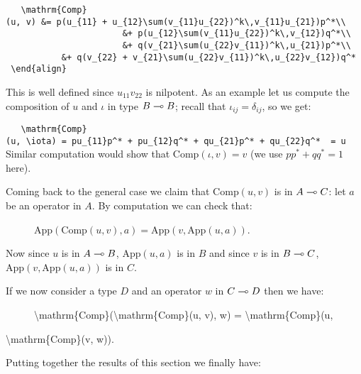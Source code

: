 \texttt{~~~\textbackslash{}mathrm\{Comp\}(u,~v)~\&=~p(u\_\{11\}~+~u\_\{12\}\textbackslash{}sum(v\_\{11\}u\_\{22\})\^{}k\textbackslash{},v\_\{11\}u\_\{21\})p\^{}*\textbackslash{}\textbackslash{}}\\
\texttt{~~~~~~~~~~~~~~~~~~~~~~~\&+~p(u\_\{12\}\textbackslash{}sum(v\_\{11\}u\_\{22\})\^{}k\textbackslash{},v\_\{12\})q\^{}*\textbackslash{}\textbackslash{}}\\
\texttt{~~~~~~~~~~~~~~~~~~~~~~~\&+~q(v\_\{21\}\textbackslash{}sum(u\_\{22\}v\_\{11\})\^{}k\textbackslash{},u\_\{21\})p\^{}*\textbackslash{}\textbackslash{}}\\
\texttt{~~~~~~~~~~~\&+~q(v\_\{22\}~+~v\_\{21\}\textbackslash{}sum(u\_\{22\}v\_\{11\})\^{}k\textbackslash{},u\_\{22\}v\_\{12\})q\^{}*}\\
\texttt{~\textbackslash{}end\{align\}}

This is well defined since \(u_{11}v_{22}\) is nilpotent. As an example
let us compute the composition of \(u\) and \(\iota\) in type
\(B\multimap B\); recall that \(\iota_{ij} = \delta_{ij}\), so we get:

\begin{description}
\item[]
\end{description}

\texttt{~~~\textbackslash{}mathrm\{Comp\}(u,~\textbackslash{}iota)~=~pu\_\{11\}p\^{}*~+~pu\_\{12\}q\^{}*~+~qu\_\{21\}p\^{}*~+~qu\_\{22\}q\^{}*~~=~u}\\

Similar computation would show that \(\mathrm{Comp}(\iota, v) = v\) (we
use \(pp^* + qq^* = 1\) here).

Coming back to the general case we claim that \(\mathrm{Comp}(u, v)\) is
in \(A\multimap C\): let \(a\) be an operator in \(A\). By computation we
can check that:

\begin{description}
\item[]
\(\mathrm{App}(\mathrm{Comp}(u, v), a) = \mathrm{App}(v, \mathrm{App}(u, a))\).
\end{description}

Now since \(u\) is in \(A\multimap B\), \(\mathrm{App}(u, a)\) is in \(B\)
and since \(v\) is in \(B\multimap C\),
\(\mathrm{App}(v, \mathrm{App}(u, a))\) is in \(C\).

If we now consider a type \(D\) and an operator \(w\) in \(C\multimap D\)
then we have:

\begin{description}
\item[]
\textbackslash{}mathrm\{Comp\}(\textbackslash{}mathrm\{Comp\}(u, v), w)
= \textbackslash{}mathrm\{Comp\}(u,
\end{description}

\textbackslash{}mathrm\{Comp\}(v, w)).

Putting together the results of this section we finally have:


